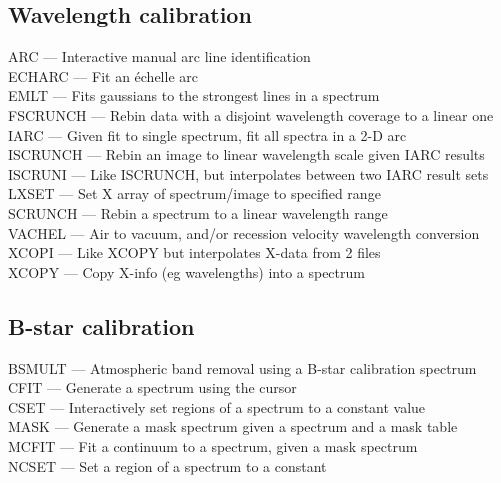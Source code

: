 \documentclass[11pt,twoside]{article}
\newcommand{\htmlref}[2]{#1}
\begin{document}

\subsection{\label{classifwavelen}Wavelength calibration}

\htmlref{ARC}{ARC} --- Interactive manual arc line identification\\
\htmlref{ECHARC}{ECHARC} --- Fit an \'echelle arc\\
\htmlref{EMLT}{EMLT} --- Fits gaussians to the strongest lines in a spectrum\\
\htmlref{FSCRUNCH}{FSCRUNCH} --- Rebin data with a disjoint wavelength coverage to a linear one\\
\htmlref{IARC}{IARC} --- Given fit to single spectrum, fit all spectra in a 2-D arc\\
\htmlref{ISCRUNCH}{ISCRUNCH} --- Rebin an image to linear wavelength scale given IARC results\\
\htmlref{ISCRUNI}{ISCRUNI} --- Like ISCRUNCH, but interpolates between two IARC result sets\\
\htmlref{LXSET}{LXSET} --- Set X array of spectrum/image to specified range\\
\htmlref{SCRUNCH}{SCRUNCH} --- Rebin a spectrum to a linear wavelength range\\
\htmlref{VACHEL}{VACHEL} --- Air to vacuum, and/or recession velocity wavelength conversion\\
\htmlref{XCOPI}{XCOPI} --- Like XCOPY but interpolates X-data from 2 files\\
\htmlref{XCOPY}{XCOPY} --- Copy X-info (eg wavelengths) into a spectrum


\subsection{\label{classifbstars}B-star calibration}

\htmlref{BSMULT}{BSMULT} --- Atmospheric band removal using a B-star calibration spectrum\\
\htmlref{CFIT}{CFIT} --- Generate a spectrum using the cursor\\
\htmlref{CSET}{CSET} --- Interactively set regions of a spectrum to a constant value\\
\htmlref{MASK}{MASK} --- Generate a mask spectrum given a spectrum and a mask table\\
\htmlref{MCFIT}{MCFIT} --- Fit a continuum to a spectrum, given a mask spectrum\\
\htmlref{NCSET}{NCSET} --- Set a region of a spectrum to a constant
\end{document}
